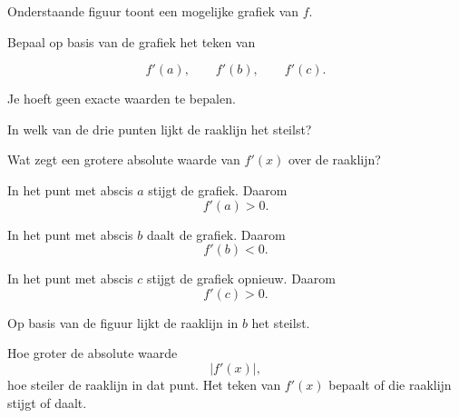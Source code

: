 \documentclass{ximera}
\begin{document}

\begin{oefening}{\oefU\ESS}

Onderstaande figuur toont een mogelijke grafiek van $f$.

\begin{center}
\end{center}

\begin{question}
Bepaal op basis van de grafiek het teken van

\[
f'(a),\qquad f'(b),\qquad f'(c).
\]

Je hoeft geen exacte waarden te bepalen.
\end{question}

\begin{question}
In welk van de drie punten lijkt de raaklijn het steilst?
\end{question}

\begin{question}
Wat zegt een grotere absolute waarde van $f'(x)$ over de raaklijn?
\end{question}

\begin{oplossing}

In het punt met abscis $a$ stijgt de grafiek. Daarom
\[
f'(a)>0.
\]

In het punt met abscis $b$ daalt de grafiek. Daarom
\[
f'(b)<0.
\]

In het punt met abscis $c$ stijgt de grafiek opnieuw. Daarom
\[
f'(c)>0.
\]

Op basis van de figuur lijkt de raaklijn in $b$ het steilst.

Hoe groter de absolute waarde
\[
|f'(x)|,
\]
hoe steiler de raaklijn in dat punt. Het teken van $f'(x)$ bepaalt of die
raaklijn stijgt of daalt.

\end{oplossing}

\end{oefening}
\end{document}
